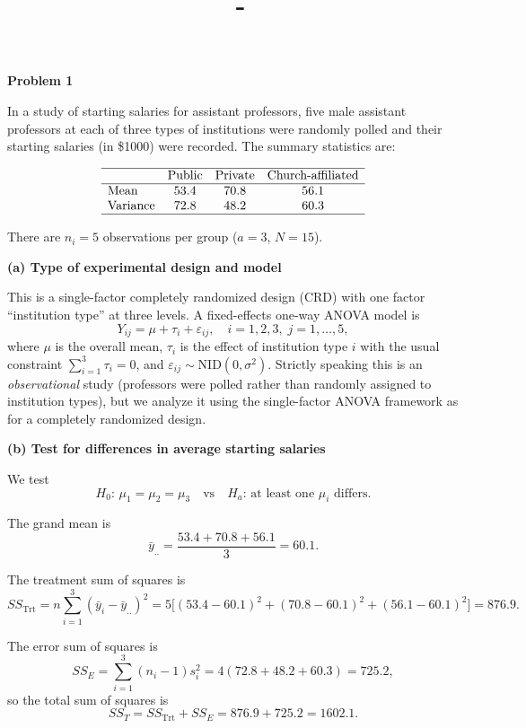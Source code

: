 \documentclass[answers,12pt,addpoints]{exam}
\author{\name}
\title{\course \ - \assignment}
\begin{document}
\maketitle

\textbf{Problem 1}

In a study of starting salaries for assistant professors, five male
assistant professors at each of three types of institutions were randomly
polled and their starting salaries (in \$1000) were recorded. The summary
statistics are:

\[
\begin{array}{lccc}
\hline
& \text{Public} & \text{Private} & \text{Church-affiliated} \\
\hline
\text{Mean} & 53.4 & 70.8 & 56.1 \\
\text{Variance} & 72.8 & 48.2 & 60.3 \\
\hline
\end{array}
\]

There are $n_i = 5$ observations per group ($a=3$, $N=15$).

\medskip
\textbf{(a) Type of experimental design and model}

This is a single-factor completely randomized design (CRD) with one factor
``institution type'' at three levels. A fixed-effects one-way ANOVA model is
\[
Y_{ij} = \mu + \tau_i + \varepsilon_{ij},\quad i=1,2,3,\; j=1,\dots,5,
\]
where $\mu$ is the overall mean, $\tau_i$ is the effect of institution type $i$
with the usual constraint $\sum_{i=1}^3 \tau_i = 0$, and
$\varepsilon_{ij} \sim \mathrm{NID}(0,\sigma^2)$.
Strictly speaking this is an \emph{observational} study (professors were
polled rather than randomly assigned to institution types), but we analyze it
using the single-factor ANOVA framework as for a completely randomized design.

\medskip
\textbf{(b) Test for differences in average starting salaries}

We test
\[
H_0:\,\mu_1 = \mu_2 = \mu_3
\quad\text{vs}\quad
H_a:\,\text{at least one }\mu_i\text{ differs}.
\]

The grand mean is
\[
\bar{y}_{..} = \frac{53.4 + 70.8 + 56.1}{3} = 60.1.
\]

The treatment sum of squares is
\[
SS_{\text{Trt}}
= n\sum_{i=1}^3(\bar{y}_i - \bar{y}_{..})^2
= 5\bigl[(53.4-60.1)^2 + (70.8-60.1)^2 + (56.1-60.1)^2\bigr]
= 876.9.
\]

The error sum of squares is
\[
SS_E = \sum_{i=1}^3 (n_i - 1)s_i^2
= 4(72.8 + 48.2 + 60.3) = 725.2,
\]
so the total sum of squares is
\[
SS_T = SS_{\text{Trt}} + SS_E = 876.9 + 725.2 = 1602.1.
\]
\end{document}
